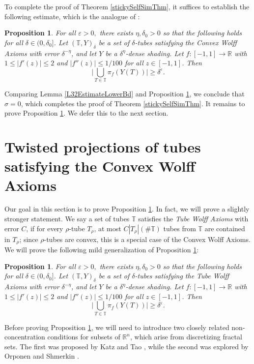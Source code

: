 \documentclass[letterpaper, reqno,11pt]{article}
\numberwithin{equation}{section}
\newcommand{\RR}{\mathbb{R}}
\newcommand{\eps}{\varepsilon}
\newcommand{\tubes}{\mathbb{T}}
\numberwithin{thm}{section}
\newtheorem{prop}[thm]{Proposition}
\theoremstyle{remark}
\begin{document}
To complete the proof of Theorem \ref{stickySelfSimThm}, it suffices to establish the following estimate, which is the analogue of \cite[Proposition 7.1]{WZ}:
\begin{prop}\label{L32EstimateUpperBd}
For all $\eps>0,$ there exists $\eta,\delta_0>0$ so that the following holds for all $\delta\in(0,\delta_0]$. Let $(\tubes,Y)_\delta$ be a set of $\delta$-tubes satisfying the Convex Wolff Axioms with error $\delta^{-\eta}$, and let $Y$ be a $\delta^\eta$-dense shading. Let $f\colon[-1,1]\to\RR$ with $1\leq |f'(z)|\leq 2$ and $|f''(z)|\leq 1/100$ for all $z\in[-1,1]$. Then 
\[
\Big| \bigcup_{T\in\tubes}\pi_f (Y(T))\Big| \geq \delta^{\eps}.
\]
\end{prop}
Comparing Lemma \ref{L32EstimateLowerBd} and Proposition \ref{L32EstimateUpperBd}, we conclude that $\sigma=0$, which completes the proof of Theorem \ref{stickySelfSimThm}. It remains to prove Proposition \ref{L32EstimateUpperBd}. We defer this to the next section.



\section{Twisted projections of tubes satisfying the Convex Wolff Axioms}\label{twistedProjectionsTubeSec}
Our goal in this section is to prove Proposition \ref{L32EstimateUpperBd}. In fact, we will prove a slightly stronger statement. We say a set of tubes $\tubes$ satisfies the \emph{Tube Wolff Axioms} with error $C$, if for every $\rho$-tube $T_\rho$, at most $C|T_\rho|(\#\tubes)$ tubes from $\tubes$ are contained in $T_\rho$; since $\rho$-tubes are convex, this is a special case of the Convex Wolff Axioms. We will prove the following mild generalization of Proposition \ref{L32EstimateUpperBd}:

\begin{prop}\label{strengthenedL32EstimateUpperBd}
For all $\eps>0,$ there exists $\eta,\delta_0>0$ so that the following holds for all $\delta\in(0,\delta_0]$. Let $(\tubes,Y)_\delta$ be a set of $\delta$-tubes satisfying the Tube Wolff Axioms with error $\delta^{-\eta}$, and let $Y$ be a $\delta^\eta$-dense shading. Let $f\colon[-1,1]\to\RR$ with $1\leq |f'(z)|\leq 2$ and $|f''(z)|\leq 1/100$ for all $z\in[-1,1]$. Then 
\[
\Big| \bigcup_{T\in\tubes}\pi_f (Y(T))\Big| \geq \delta^{\eps}.
\]
\end{prop}


Before proving Proposition \ref{strengthenedL32EstimateUpperBd}, we will need to introduce two closely related non-concentration conditions for subsets of $\RR^n$, which arise from discretizing fractal sets. The first was proposed by Katz and Tao \cite{KT01}, while the second was explored by Orponen and Shmerkin \cite{OrponenShmerkin2}.
\end{document}
